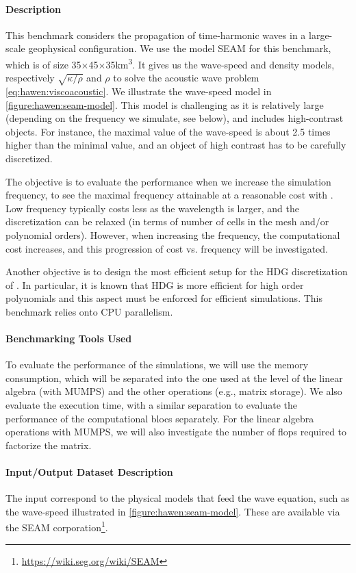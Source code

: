\paragraph{Description}
This benchmark considers the propagation of time-harmonic waves in a large-scale
geophysical configuration. We use the model SEAM for this benchmark, which is of
size \num{35}$\times$\num{45}$\times$\num{35}\si{\km\cubed}.  
It gives us the wave-speed and density models, respectively $\sqrt{\kappa/\rho}$ 
and $\rho$ to solve the acoustic wave problem \cref{eq:hawen:viscoacoustic}.
We illustrate the wave-speed model in \cref{figure:hawen:seam-model}.
This model is challenging as it is relatively large (depending on the frequency
we simulate, see below), and includes high-contrast objects. 
For instance, the maximal value of the wave-speed is about 2.5 times higher than
the minimal value, and an object of high contrast has to be carefully discretized.


The objective is to evaluate the performance when we increase the simulation frequency,
to see the maximal frequency attainable at a reasonable cost with \hawen.
Low frequency typically costs less as the wavelength is larger, and the discretization 
can be relaxed (in terms of number of cells in the mesh and/or polynomial orders).
However, when increasing the frequency, the computational cost increases, and this 
progression of cost vs. frequency will be investigated.

Another objective is to design the most efficient setup for the HDG discretization 
of \hawen. In particular, it is known that HDG is more efficient for high order 
polynomials and this aspect must be enforced for efficient simulations. This benchmark
relies onto CPU parallelism.


\paragraph{Benchmarking Tools Used}
To evaluate the performance of the simulations, we will use the memory consumption, 
which will be separated into the one used at the level of the linear algebra (with 
MUMPS) and the other operations (e.g., matrix storage). 
We also evaluate the execution time, with a similar separation to evaluate the 
performance of the computational blocs separately.
For the linear algebra operations with MUMPS, we will also investigate the number
of flops required to factorize the matrix.

\paragraph{Input/Output Dataset Description} The input correspond to the 
physical models that feed the wave equation, such as the wave-speed illustrated
in \cref{figure:hawen:seam-model}. These are available via the SEAM 
corporation\footnote{\url{https://wiki.seg.org/wiki/SEAM}}.

